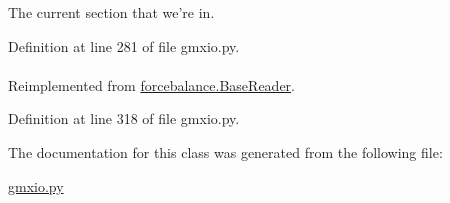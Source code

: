 \-The current section that we're in. 



\-Definition at line 281 of file gmxio.\-py.

\hypertarget{classforcebalance_1_1gmxio_1_1ITP__Reader_ab35c32e7ecf74028641613f90906bd37}{
\paragraph[{suffix}]{}}\label{classforcebalance_1_1gmxio_1_1ITP__Reader_ab35c32e7ecf74028641613f90906bd37}


\-Reimplemented from \hyperlink{classforcebalance_1_1BaseReader_a48ef0584a1b6b4b6f8eb741ad8465db8}{forcebalance.\-Base\-Reader}.



\-Definition at line 318 of file gmxio.\-py.



\-The documentation for this class was generated from the following file\-:\begin{DoxyCompactItemize}
\item 
\hyperlink{gmxio_8py}{gmxio.\-py}\end{DoxyCompactItemize}
